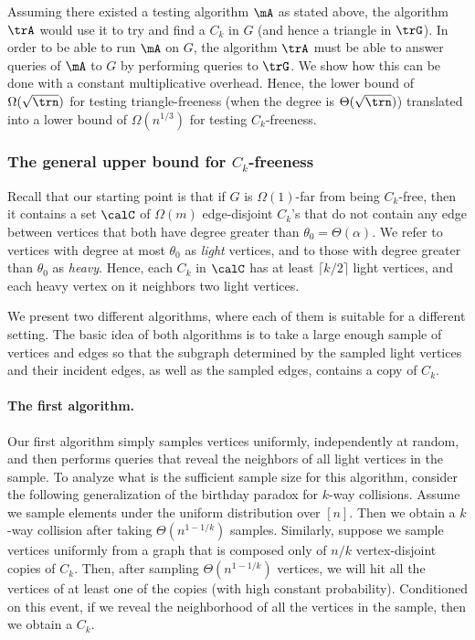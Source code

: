 Assuming there existed a testing algorithm $\mA$ as stated above, the algorithm $\trA$ would use it to try and find a $C_k$ in $G$ (and hence a triangle in $\trG$). In order to be able to run $\mA$ on $G$, the algorithm $\trA$ must be able to answer queries of $\mA$ to $G$ by performing queries to $\trG$. We show how this can be done with  a constant multiplicative overhead.
Hence, the lower bound of $\Omega(\sqrt{\trn})$ for testing triangle-freeness (when the degree is $\Theta(\sqrt{\trn})$) translated into a lower bound of $\Omega(n^{1/3})$ for testing $C_k$-freeness.



\subsubsection{The general upper bound for  $C_k$-freeness}
Recall that our starting point is that if $G$ is $\Omega(1)$-far from being $C_k$-free, then it contains a set $\calC$ of $\Omega(m)$ edge-disjoint $C_k$'s that do not contain any edge between vertices that both have degree greater than $\theta_0 = \Theta(\alpha)$. We refer to vertices with degree at most $\theta_0$ as \emph{light} vertices, and to those with degree greater than $\theta_0$ as \emph{heavy}.
Hence, each $C_k$ in $\calC$ has at least $\lceil k/2\rceil$ light vertices, and each heavy vertex
on it neighbors two light vertices.

We present two different algorithms, where each of them is suitable for a different setting. The basic idea of both algorithms is to take a large enough sample of vertices and edges so that the  subgraph determined by 
the sampled light vertices and their incident edges, as well as the sampled edges, contains a copy of $C_k$. 

\paragraph{The first algorithm.}
Our first algorithm simply samples vertices uniformly, independently at random, and then performs queries that reveal the neighbors of all light vertices in the sample.
To analyze what is the sufficient sample size for this algorithm, consider the following generalization of the birthday paradox for $k$-way collisions. Assume we sample elements under the uniform distribution over $[n]$. Then we obtain a $k$-way collision after taking $\Theta(n^{1-1/k})$ samples.
Similarly, suppose  we sample vertices uniformly from a graph that is composed only of $n/k$  vertex-disjoint copies of $C_k$. Then, after sampling $\Theta(n^{1-1/k})$ vertices, we will hit all the vertices of at least one of the copies (with high constant probability).
Conditioned on this event, if we reveal the neighborhood of all the vertices in the sample, then  we obtain a $C_k$.

